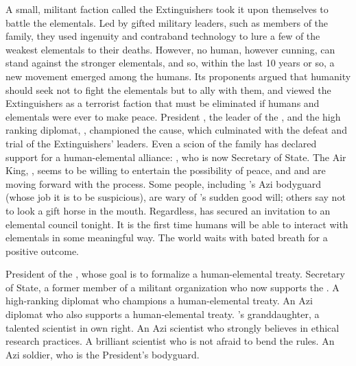 \documentclass[blue]{elementals}
\begin{document}
A small, militant faction called the Extinguishers took it upon themselves to battle the elementals.  Led by gifted military leaders, such as members of the \cDema{\formal} family, they used ingenuity and contraband technology to lure a few of the weakest elementals to their deaths.  However, no human, however cunning, can stand against the stronger elementals, and so, within the last 10 years or so, a new movement emerged among the humans. Its proponents argued that humanity should seek not to fight the elementals but to ally with them, and viewed the Extinguishers as a terrorist faction that must be eliminated if humans and elementals were ever to make peace. President \cLeader{\full}, the leader of the \cNewUN{\full}, and the high ranking diplomat, \cAvatar{\full}, championed the cause, which culminated with the defeat and trial of the Extinguishers' leaders. Even a scion of the \cDema{\formal} family has declared support for a human-elemental alliance: \cDema{}, who is now Secretary of State. The Air King, \cKing{}, seems to be willing to entertain the possibility of peace, and \cLeader{} and \cAvatar{} are moving forward with the process. Some people, including \cLeader{}'s Azi bodyguard \cRomeo{\full} (whose job it is to be suspicious), are wary of \cKing{}'s sudden good will; others say not to look a gift horse in the mouth. Regardless, \cLeader{} has secured an invitation to an elemental council tonight. It is the first time humans will be able to interact with elementals in some meaningful way. The world waits with bated breath for a positive outcome.

\begin{members}
  \member{\cLeader{}} President of the \cNewUN{\full}, whose goal is to formalize a human-elemental treaty.
  \member{\cDema{}} Secretary of State, a former member of a militant organization who now supports the \cNewUN{\full}.
  \member{\cAvatar{}} A high-ranking diplomat who champions a human-elemental treaty.
  \member{\cDiplomat{}} An Azi diplomat who also supports a human-elemental treaty.
  \member{\cGD{}} \cGrandfather{\full}'s granddaughter, a talented scientist in \cGD{\their} own right. 
  \member{\cScientist{}} An Azi scientist who strongly believes in ethical research practices.
  \member{\cMS{}} A brilliant scientist who is not afraid to bend the rules.
  \member{\cRomeo{}} An Azi soldier, who is the President's bodyguard.
\end{members}


\end{document}
